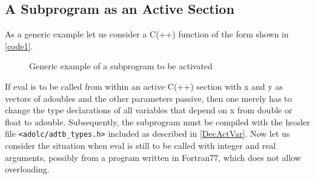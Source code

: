 \documentclass[11pt,twoside]{article}
\begin{document}
\subsection{A Subprogram as an Active Section} 
%
As a generic example let us consider a C(++) function of the form
shown in \autoref{code1}.
%
\begin{figure}[hbt]
\caption{Generic example of a subprogram to be activated}
\label{code1}
\end{figure}
%

If {\sf eval} is to be called from within an active C(++)
section with {\sf x}
and {\sf y} as vectors of {\sf adouble}s and the other parameters
passive, then one merely has to change the type declarations of all
variables that depend on {\sf x} from {\sf double} or {\sf float} to
{\sf adouble}. Subsequently, the subprogram must be compiled with the
header file \verb=<adolc/adtb_types.h>= included as described
in \autoref{DecActVar}. Now let us consider the situation when {\sf eval} is
still to be called with integer and real arguments, possibly from
a program written in Fortran77, which  does not allow overloading. 
\end{document}
